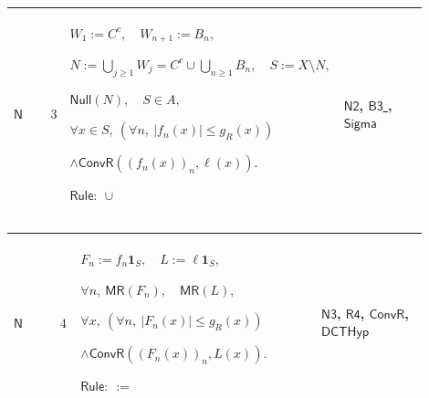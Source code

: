 \documentclass[12pt,reqno]{amsart}
\theoremstyle{blueplain}
\numberwithin{equation}{section}
\begin{document}
{\scriptsize \setlength{\parskip}{0pt}\nointerlineskip
\noindent 
\begin{tabular}{|@{}>{\centering\arraybackslash}m{0.10658\linewidth}|>{\centering\arraybackslash}m{0.03553\linewidth}|>{\centering\arraybackslash}m{0.52105\linewidth}|>{\centering\arraybackslash}m{0.23684\linewidth}|}
\hline
\hypertarget{dct:N3}{$\displaystyle \mathsf{N}$} & $\displaystyle 3$ & $%
\displaystyle W_1:=C^c,\quad W_{n+1}:=B_n,$\par$\displaystyle %
N:=\bigcup_{j\ge1}W_j=C^c\cup\bigcup_{n\ge1}B_n,\quad S:=X\setminus N,$\par$%
\displaystyle \mathsf{Null}(N),\quad S\in A,$\par$\displaystyle \forall x\in
S,\ (\forall n,\ |f_n(x)|\le g_R(x))$\par$\displaystyle \land\mathsf{ConvR}%
((f_n(x))_n,\ell(x)).$\par$\displaystyle \mathsf{Rule}:\ \cup$ & \hyperlink{dct:N2}%
{$\displaystyle \mathsf{N2}$}, \hyperlink{dct:B3}{$\displaystyle \mathsf{B3}$%
}, \hyperlink{ax:Sigma}{$\displaystyle \mathsf{Sigma}$} \\ \hline
\end{tabular}%
}

{\scriptsize \setlength{\parskip}{0pt}\nointerlineskip
\noindent 
\begin{tabular}{|@{}>{\centering\arraybackslash}m{0.10658\linewidth}|>{\centering\arraybackslash}m{0.03553\linewidth}|>{\centering\arraybackslash}m{0.52105\linewidth}|>{\centering\arraybackslash}m{0.23684\linewidth}|}
\hline
\hypertarget{dct:N4}{$\displaystyle \mathsf{N}$} & $\displaystyle 4$ & $%
\displaystyle F_n:=f_n\mathbf{1}_S,\quad L:=\ell\mathbf{1}_S,$\par$%
\displaystyle \forall n,\ \mathsf{MR}(F_n),\quad\mathsf{MR}(L),$\par$%
\displaystyle \forall x,\ (\forall n,\ |F_n(x)|\le g_R(x))$\par$%
\displaystyle \land\mathsf{ConvR}((F_n(x))_n,L(x)).$\par$\displaystyle 
\mathsf{Rule}:\ :=$ & \hyperlink{dct:N3}{$\displaystyle \mathsf{N3}$}, 
\hyperlink{dct:R4}{$\displaystyle \mathsf{R4}$}, \hyperlink{dctdef:ConvR}{$%
\displaystyle \mathsf{ConvR}$}, \hyperlink{dctdef:DCTHyp}{$\displaystyle 
\mathsf{DCTHyp}$} \\ \hline
\end{tabular}%
}
\end{document}
